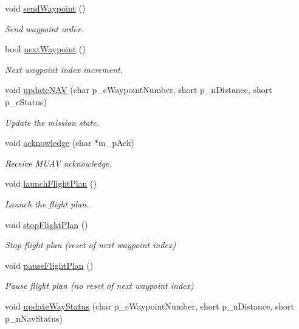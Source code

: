 \begin{DoxyCompactItemize}
void \hyperlink{class_mission_control_a3b0071ab42586c2e977d3b0cf5c51481}{send\-Waypoint} ()
\begin{DoxyCompactList}\small\item\em Send waypoint order. \end{DoxyCompactList}\item 
bool \hyperlink{class_mission_control_a2c551d71ffba58d6dfa3c7d79740d469}{next\-Waypoint} ()
\begin{DoxyCompactList}\small\item\em Next waypoint index increment. \end{DoxyCompactList}\item 
void \hyperlink{class_mission_control_a0e0ca0b8f8b6aaf1002f6c0d2d02a613}{update\-N\-A\-V} (char p\-\_\-c\-Waypoint\-Number, short p\-\_\-n\-Distance, short p\-\_\-c\-Status)
\begin{DoxyCompactList}\small\item\em Update the mission state. \end{DoxyCompactList}\item 
void \hyperlink{class_mission_control_a0bedf933ae1145e37929aed443923e38}{acknowledge} (char $\ast$m\-\_\-p\-Ack)
\begin{DoxyCompactList}\small\item\em Receive M\-U\-A\-V acknowledge. \end{DoxyCompactList}\item 
void \hyperlink{class_mission_control_ac826d823b8d0bc19ca9f255185c64eaa}{launch\-Flight\-Plan} ()
\begin{DoxyCompactList}\small\item\em Launch the flight plan. \end{DoxyCompactList}\item 
void \hyperlink{class_mission_control_a2de303345ac0d1c43f049f1e26d50a9c}{stop\-Flight\-Plan} ()
\begin{DoxyCompactList}\small\item\em Stop flight plan (reset of next waypoint index) \end{DoxyCompactList}\item 
void \hyperlink{class_mission_control_adb4d39b7d581708e680fc1bb6f2c1dcb}{pause\-Flight\-Plan} ()
\begin{DoxyCompactList}\small\item\em Pause flight plan (no reset of next waypoint index) \end{DoxyCompactList}\item 
void \hyperlink{class_mission_control_a7555f73b77346a731b38d9ffb7436200}{update\-Way\-Status} (char p\-\_\-c\-Waypoint\-Number, short p\-\_\-n\-Distance, short p\-\_\-n\-Nav\-Status)

\end{DoxyCompactItemize}
